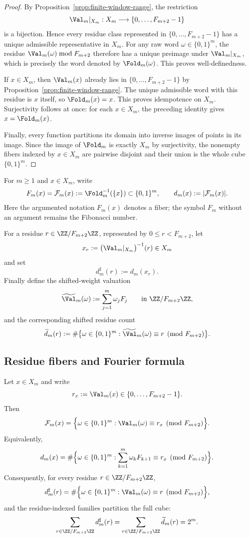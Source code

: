 \begin{proof}
By Proposition~\ref{prop:finite-window-range}, the restriction
\[
\Val_m|_{X_m}:X_m\longrightarrow \{0,\ldots,F_{m+2}-1\}
\]
is a bijection.  Hence every residue class represented in
$\{0,\ldots,F_{m+2}-1\}$ has a unique admissible representative in $X_m$.
For any raw word $\omega\in\{0,1\}^m$, the residue
$\Val_m(\omega)\bmod F_{m+2}$ therefore has a unique preimage under
$\Val_m|_{X_m}$, which is precisely the word denoted by $\Fold_m(\omega)$.
This proves well-definedness.

If $x\in X_m$, then $\Val_m(x)$ already lies in
$\{0,\ldots,F_{m+2}-1\}$ by Proposition~\ref{prop:finite-window-range}.
The unique admissible word with this residue is $x$ itself, so
$\Fold_m(x)=x$.  This proves idempotence on $X_m$.  Surjectivity follows at
once: for each $x\in X_m$, the preceding identity gives $x=\Fold_m(x)$.

Finally, every function partitions its domain into inverse images of points in
its image.  Since the image of $\Fold_m$ is exactly $X_m$ by surjectivity, the
nonempty fibers indexed by $x\in X_m$ are pairwise disjoint and their union is
the whole cube $\{0,1\}^m$.
\end{proof}

\begin{definition}\label{def:fiber-notation-and-residue-counts}
For $m\ge1$ and $x\in X_m$, write
\[
F_m(x)=\mathcal F_m(x):=\Fold_m^{-1}(\{x\})\subset\{0,1\}^m,
\qquad
d_m(x):=|\mathcal F_m(x)|.
\]
Here the argumented notation $F_m(x)$ denotes a fiber; the symbol $F_m$
without an argument remains the Fibonacci number.

For a residue $r\in\ZZ/F_{m+2}\ZZ$, represented by
$0\le r<F_{m+2}$, let
\[
x_r:=\bigl(\Val_m|_{X_m}\bigr)^{-1}(r)\in X_m
\]
and set
\[
d_m^\sharp(r):=d_m(x_r).
\]
Finally define the shifted-weight valuation
\[
\widetilde{\Val}_m(\omega):=\sum_{j=1}^m \omega_j F_j
\qquad\text{in }\ZZ/F_{m+2}\ZZ,
\]
and the corresponding shifted residue count
\[
\widetilde d_m(r):=
\#\bigl\{\omega\in\{0,1\}^m:
\widetilde{\Val}_m(\omega)\equiv r\pmod {F_{m+2}}\bigr\}.
\]
\end{definition}

\subsection{Residue fibers and Fourier formula}\label{sec:stab:fiber}

\begin{proposition}\label{thm:fiber-residue}
Let $x\in X_m$ and write
\[
r_x:=\Val_m(x)\in\{0,\ldots,F_{m+2}-1\}.
\]
Then
\[
\mathcal F_m(x)=
\Bigl\{\omega\in\{0,1\}^m:
\Val_m(\omega)\equiv r_x \pmod {F_{m+2}}\Bigr\}.
\]
Equivalently,
\[
d_m(x)=
\#\Bigl\{\omega\in\{0,1\}^m:
\sum_{k=1}^m\omega_kF_{k+1}\equiv r_x\pmod {F_{m+2}}\Bigr\}.
\]
Consequently, for every residue $r\in\ZZ/F_{m+2}\ZZ$,
\[
d_m^\sharp(r)=
\#\Bigl\{\omega\in\{0,1\}^m:
\Val_m(\omega)\equiv r\pmod {F_{m+2}}\Bigr\},
\]
and the residue-indexed families partition the full cube:
\[
\sum_{r\in\ZZ/F_{m+2}\ZZ} d_m^\sharp(r)
=
\sum_{r\in\ZZ/F_{m+2}\ZZ} \widetilde d_m(r)
=2^m.
\]
\end{proposition}

